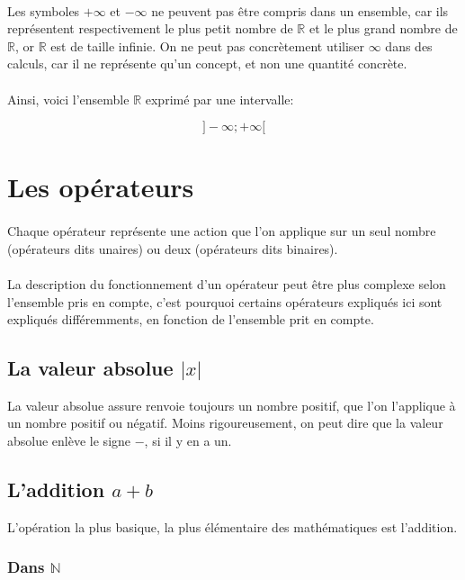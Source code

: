 \documentclass[a4paper]{book}
\begin{document}
    \paragraph{}
    Les symboles $+\infty$ et $-\infty$ ne peuvent pas être compris dans un ensemble, car ils représentent respectivement le plus petit nombre de $\mathds{R}$ et le plus grand nombre de $\mathds{R}$, or $\mathds{R}$ est de taille infinie. On ne peut pas concrètement utiliser $\infty$ dans des calculs, car il ne représente qu'un concept, et non une quantité concrète.
    
    
    \paragraph{}
    Ainsi, voici l'ensemble $\mathds{R}$ exprimé par une intervalle:
    
    $$]-\infty; +\infty[$$
    
    \section{Les opérateurs}
    \paragraph{}
    Chaque opérateur représente une action que l'on applique sur un seul nombre (opérateurs dits unaires) ou deux (opérateurs dits binaires).
    \paragraph{}
    La description du fonctionnement d'un opérateur peut être plus complexe selon l'ensemble pris en compte, c'est pourquoi certains opérateurs expliqués ici sont expliqués différemments, en fonction de l'ensemble prit en compte.
    \subsection{La valeur absolue $|x|$}
    La valeur absolue assure renvoie toujours un nombre positif, que l'on l'applique à un nombre positif ou négatif. Moins rigoureusement, on peut dire que la valeur absolue enlève le signe $-$, si il y en a un.
    \subsection{L'addition $a + b$}
    L'opération la plus basique, la plus élémentaire des mathématiques est l'addition.
    \subsubsection{Dans $\mathds{N}$}
\end{document}
